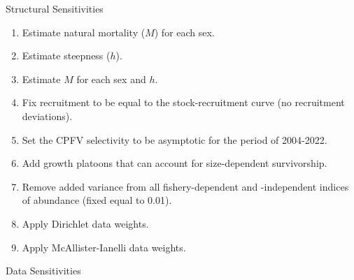 \documentclass[11pt,
  english,
  letterpaper,
]{article}
\begin{document}
Structural Sensitivities

\begin{enumerate}
   
  \item  Estimate natural mortality ($M$) for each sex.
  
  \item Estimate steepness ($h$).
  
  \item Estimate $M$ for each sex and $h$.
  
  \item Fix recruitment to be equal to the stock-recruitment curve (no recruitment deviations).
  
  \item Set the CPFV selectivity to be asymptotic for the period of 2004-2022.
  
  \item Add growth platoons that can account for size-dependent survivorship.
  
  \item Remove added variance from all fishery-dependent and -independent indices of abundance (fixed equal to 0.01).
  
  \item Apply Dirichlet data weights.
  
  \item Apply McAllister-Ianelli data weights.

\end{enumerate}

Data Sensitivities
\end{document}
